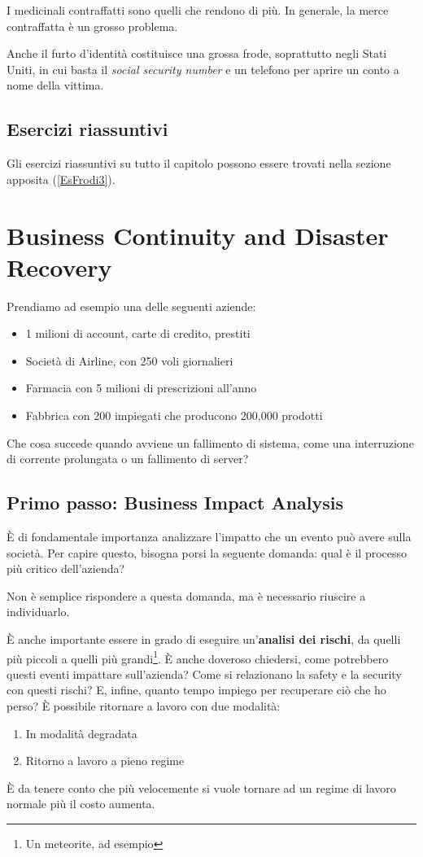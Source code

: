 I medicinali contraffatti sono quelli che rendono di più. In generale, la merce
contraffatta è un grosso problema.

Anche il furto d'identità costituisce una grossa frode, soprattutto negli
Stati Uniti, in cui basta il \emph{social security number} e un telefono per aprire un conto
a nome della vittima.

\section{Esercizi riassuntivi}

Gli esercizi riassuntivi su tutto il capitolo possono essere trovati nella
sezione apposita (\ref{EsFrodi3}).

\chapter{Business Continuity and Disaster Recovery}
\label{BCDR}

Prendiamo ad esempio una delle seguenti aziende:
\begin{itemize}
  \item 1 milioni di account, carte di credito, prestiti
  \item Società di Airline, con 250 voli giornalieri
  \item Farmacia con 5 milioni di prescrizioni all'anno
  \item Fabbrica con 200 impiegati che producono 200,000 prodotti
\end{itemize}

Che cosa succede quando avviene un fallimento di sistema, come una interruzione
di corrente prolungata o un fallimento di server?

\section{Primo passo: Business Impact Analysis}

È di fondamentale importanza analizzare l'impatto che un evento può avere sulla
società. Per capire questo, bisogna porsi la seguente domanda: qual è il
processo più critico dell'azienda?

Non è semplice rispondere a questa domanda, ma è necessario riuscire a
individuarlo.

È anche importante essere in grado di eseguire un'\textbf{analisi dei rischi},
da quelli più piccoli a quelli più grandi\footnote{Un meteorite, ad esempio}. È
anche doveroso chiedersi, come potrebbero questi eventi impattare sull'azienda?
Come si relazionano la safety e la security con questi rischi? E, infine,
quanto tempo impiego per recuperare ciò che ho perso? È possibile ritornare a
lavoro con due modalità:
\begin{enumerate}
  \item In modalità degradata
  \item Ritorno a lavoro a pieno regime
\end{enumerate}

È da tenere conto che più velocemente si vuole tornare ad un regime di lavoro
normale più il costo aumenta.

